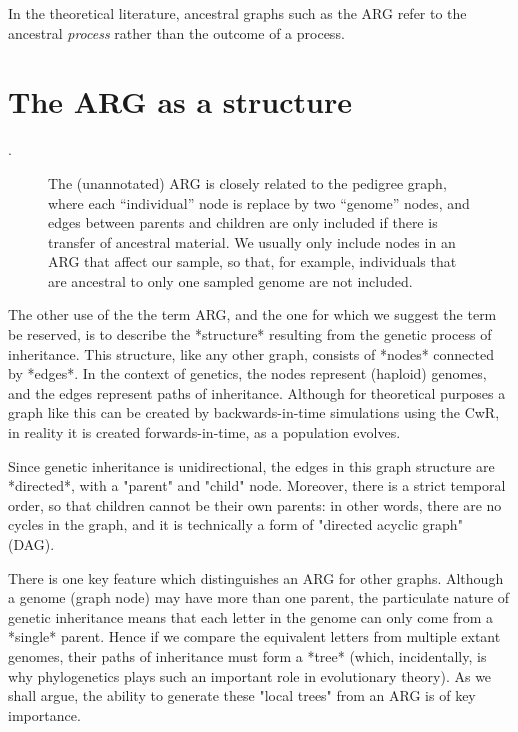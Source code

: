 \documentclass{article}
\begin{document}
In the theoretical literature, ancestral graphs such as the ARG refer to the
ancestral \emph{process} rather than the outcome of a process.

\section*{The ARG as a structure}

\citep[e.g.][]{minichiello2006mapping,mathieson2020ancestry}.

\begin{figure}
\vspace{5em}
\caption{\label{fig-pedigree-and-arg}
The (unannotated) ARG is closely related to the pedigree
graph, where each ``individual'' node is replace by two ``genome''
nodes, and edges between parents and children are only included if there is
transfer of ancestral material. We usually only include nodes in an ARG
that affect our sample, so that, for example, individuals that are ancestral
to only one sampled genome are not included.}
\end{figure}



The other use of the the term ARG, and the one for which we suggest the term be
reserved, is to describe the *structure* resulting from the genetic process of
inheritance. This structure, like any other graph, consists of *nodes*
connected by *edges*. In the context of genetics, the nodes represent (haploid)
genomes, and the edges represent paths of inheritance. Although for theoretical
purposes a graph like this can be created by backwards-in-time simulations
using the CwR, in reality it is created forwards-in-time, as a population
evolves.

Since genetic inheritance is unidirectional, the edges in this graph structure
are *directed*, with a "parent" and "child" node. Moreover, there is a strict
temporal order, so that children cannot be their own parents: in other words,
there are no cycles in the graph, and it is technically a form of "directed
acyclic graph" (DAG).


There is one key feature which distinguishes an ARG for other graphs. Although
a genome (graph node) may have more than one parent, the particulate nature of
genetic inheritance means that each letter in the genome can only come from a
*single* parent. Hence if we compare the equivalent letters from multiple
extant genomes, their paths of inheritance must form a *tree* (which,
incidentally, is why phylogenetics plays such an important role in evolutionary
theory). As we shall argue, the ability to generate these "local trees" from an
ARG is of key importance.
\end{document}
